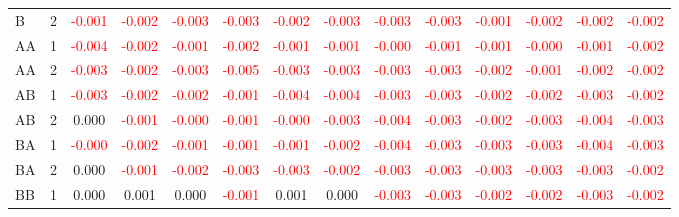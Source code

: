 \begin{table}[!htb]
{\begin{tabular}{llcccccccccccc}
B & 2 & \textcolor{red}{-0.001} & \textcolor{red}{-0.002} & \textcolor{red}{-0.003} & \textcolor{red}{-0.003} & \textcolor{red}{-0.002} & \textcolor{red}{-0.003} & \textcolor{red}{-0.003} & \textcolor{red}{-0.003} & \textcolor{red}{-0.001} & \textcolor{red}{-0.002} & \textcolor{red}{-0.002} & \textcolor{red}{-0.002}\\
AA & 1 & \textcolor{red}{-0.004} & \textcolor{red}{-0.002} & \textcolor{red}{-0.001} & \textcolor{red}{-0.002} & \textcolor{red}{-0.001} & \textcolor{red}{-0.001} & \textcolor{red}{-0.000} & \textcolor{red}{-0.001} & \textcolor{red}{-0.001} & \textcolor{red}{-0.000} & \textcolor{red}{-0.001} & \textcolor{red}{-0.002}\\
AA & 2 & \textcolor{red}{-0.003} & \textcolor{red}{-0.002} & \textcolor{red}{-0.003} & \textcolor{red}{-0.005} & \textcolor{red}{-0.003} & \textcolor{red}{-0.003} & \textcolor{red}{-0.003} & \textcolor{red}{-0.003} & \textcolor{red}{-0.002} & \textcolor{red}{-0.001} & \textcolor{red}{-0.002} & \textcolor{red}{-0.002}\\
AB & 1 & \textcolor{red}{-0.003} & \textcolor{red}{-0.002} & \textcolor{red}{-0.002} & \textcolor{red}{-0.001} & \textcolor{red}{-0.004} & \textcolor{red}{-0.004} & \textcolor{red}{-0.003} & \textcolor{red}{-0.003} & \textcolor{red}{-0.002} & \textcolor{red}{-0.002} & \textcolor{red}{-0.003} & \textcolor{red}{-0.002}\\
AB & 2 & 0.000 & \textcolor{red}{-0.001} & \textcolor{red}{-0.000} & \textcolor{red}{-0.001} & \textcolor{red}{-0.000} & \textcolor{red}{-0.003} & \textcolor{red}{-0.004} & \textcolor{red}{-0.003} & \textcolor{red}{-0.002} & \textcolor{red}{-0.003} & \textcolor{red}{-0.004} & \textcolor{red}{-0.003}\\
BA & 1 & \textcolor{red}{-0.000} & \textcolor{red}{-0.002} & \textcolor{red}{-0.001} & \textcolor{red}{-0.001} & \textcolor{red}{-0.001} & \textcolor{red}{-0.002} & \textcolor{red}{-0.004} & \textcolor{red}{-0.003} & \textcolor{red}{-0.003} & \textcolor{red}{-0.003} & \textcolor{red}{-0.004} & \textcolor{red}{-0.003}\\
BA & 2 & 0.000 & \textcolor{red}{-0.001} & \textcolor{red}{-0.002} & \textcolor{red}{-0.003} & \textcolor{red}{-0.003} & \textcolor{red}{-0.002} & \textcolor{red}{-0.003} & \textcolor{red}{-0.003} & \textcolor{red}{-0.003} & \textcolor{red}{-0.003} & \textcolor{red}{-0.003} & \textcolor{red}{-0.002}\\
BB & 1 & 0.000 & 0.001 & 0.000 & \textcolor{red}{-0.001} & 0.001 & 0.000 & \textcolor{red}{-0.003} & \textcolor{red}{-0.003} & \textcolor{red}{-0.002} & \textcolor{red}{-0.002} & \textcolor{red}{-0.003} & \textcolor{red}{-0.002}\\

\end{tabular}}
\end{table}
